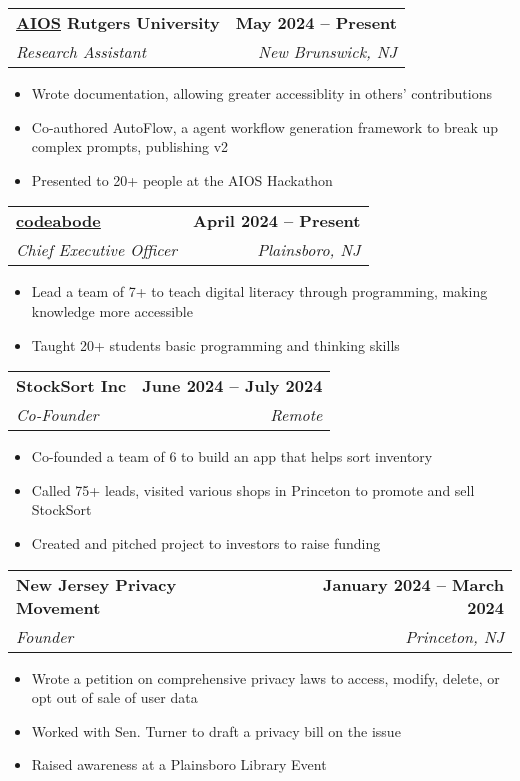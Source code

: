 \documentclass[letterpaper,11pt]{article}
\makeatletter
\newcommand{\resumeItem}[1]{
  \item\small{
    {#1 \vspace{-2pt}}
  }
}
\newcommand{\resumeSubheading}[4]{
  \vspace{-2pt}\item
    \begin{tabular*}{1.0\textwidth}[t]{l@{\extracolsep{\fill}}r}
      \textbf{#1} & \textbf{\small #2} \\
      \textit{\small#3} & \textit{\small #4} \\
    \end{tabular*}\vspace{-7pt}
}
\newcommand{\resumeItemListStart}{\begin{itemize}}
\newcommand{\resumeItemListEnd}{\end{itemize}\vspace{-5pt}}
\makeatother
\begin{document}
   \resumeSubheading
     {\href{https://github.com/agiresearch/AIOS}{\underline{AIOS}} Rutgers University}{May 2024 -- Present}
     {Research Assistant}{New Brunswick, NJ}
     \resumeItemListStart
     \resumeItem{Wrote documentation, allowing greater accessiblity in others' contributions}
     \resumeItem{Co-authored AutoFlow, a agent workflow generation framework to break up complex prompts, publishing v2 }
     \resumeItem{Presented to 20+ people at the AIOS Hackathon}
   \resumeItemListEnd

   \resumeSubheading
      {\href{https://codeabode.co}{\underline{codeabode}}}{April 2024 -- Present}
      {Chief Executive Officer}{Plainsboro, NJ}
      \resumeItemListStart
        \resumeItem{Lead a team of 7+ to teach digital literacy through programming, making knowledge more accessible}
        \resumeItem{Taught 20+ students basic programming and thinking skills}
      \resumeItemListEnd
      

    \resumeSubheading
      {StockSort Inc}{June 2024 -- July 2024}
      {Co-Founder}{Remote}
      \resumeItemListStart
        \resumeItem{Co-founded a team of 6 to build an app that helps sort inventory}
        \resumeItem{Called 75+ leads, visited various shops in Princeton to promote and sell StockSort}
        \resumeItem{Created and pitched project to investors to raise funding}
      \resumeItemListEnd

    


    \resumeSubheading
      {New Jersey Privacy Movement}{January 2024 -- March 2024}
      {Founder}{Princeton, NJ}
      \resumeItemListStart
        \resumeItem{Wrote a petition on comprehensive privacy laws to access, modify, delete, or opt out of sale of user data}
        \resumeItem{Worked with Sen. Turner to draft a privacy bill on the issue}
        \resumeItem{Raised awareness at a Plainsboro Library Event}
    \resumeItemListEnd

\end{document}
